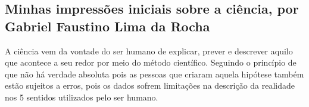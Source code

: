 \subsection{Minhas impressões iniciais sobre a ciência, por Gabriel Faustino Lima da Rocha}

A ciência vem da vontade do ser humano de explicar, prever e descrever aquilo que acontece a seu redor por meio do método científico. Seguindo o princípio de que não há verdade absoluta pois as pessoas que criaram aquela hipótese \citet{noauthor_hipotese_2020} também estão sujeitos a erros, pois os dados sofrem limitações na descrição da realidade nos 5 sentidos utilizados pelo ser humano.


